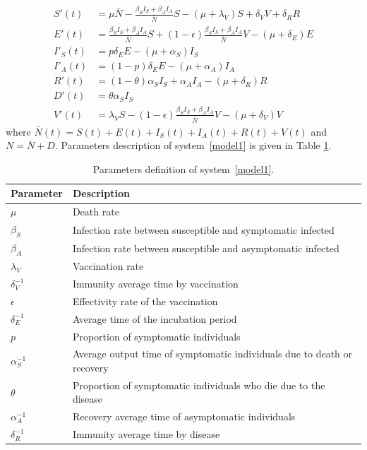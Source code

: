 \documentclass[preprint, sort&compress]{elsarticle}
\begin{document}
\begin{equation}\label{model1}
  \begin{aligned}
	S'(t)&=\mu \bar{N}-\frac{\beta_S I_S+\beta_AI_A}{\bar{N}}S-(\mu+\lambda_V)S +\delta_V V+ \delta_R R\\
	E'(t)&= \frac{\beta_S I_S+\beta_AI_A}{\bar{N}}S+(1-\epsilon) \frac{\beta_S I_S+\beta_AI_A}{\bar{N}}V-(\mu+\delta_E) E \\
	I'_S(t)&= p \delta_E E-(\mu+\alpha_S) I_S\\
	I'_A(t)&= (1-p) \delta_E E-(\mu+\alpha_A) I_A \\
	R'(t)&= (1-\theta) \alpha_S I_S+\alpha_A I_A-(\mu+\delta_R) R \\
	D'(t)&= \theta \alpha_S I_S \\
	V'(t)&= \lambda_V S-(1-\epsilon)  \frac{\beta_S I_S+\beta_AI_A}{\bar{N}}V-(\mu+\delta_V) V
      \end{aligned}
\end{equation}
where $\bar{N}(t)=S(t)+E(t)+I_S(t)+I_A(t)+R(t)+V(t)$ and $N=\bar{N}+D$. Parameters description of system~\ref{model1} is given in Table \ref{table1}.
\begin{table}[h!]
    \begin{tabular}{>{\centering}p{}p{}}
			\toprule
			Parameter & Description
      \\
      \midrule
			$\mu$ &  Death rate
			\\
            $\beta_S$ & Infection rate between susceptible and symptomatic infected
			\\
            $\beta_A$ & Infection rate between susceptible and asymptomatic infected
			\\
            $\lambda_V$ & Vaccination rate
			\\
            $\delta_{V}^{-1}$ & Immunity average time by vaccination
			\\
            $\epsilon$ &  Effectivity rate of the vaccination
			\\
            $\delta_{E}^{-1}$ & Average time of the incubation period \\
			$p$ & Proportion of symptomatic individuals  \\			
            $\alpha_{S}^{-1}$ &  Average output time of symptomatic individuals due to death or recovery  \\
            $\theta$ & Proportion of symptomatic individuals who die due to the disease \\ 
			$\alpha_{A}^{-1}$ & Recovery average time of asymptomatic individuals  \\ 					 
            $\delta_{R}^{-1}$ &  Immunity average time by disease \\
      \bottomrule
		\end{tabular}
  \caption{Parameters definition of system~\ref{model1}.}\label{table1}
\end{table}
\end{document}
